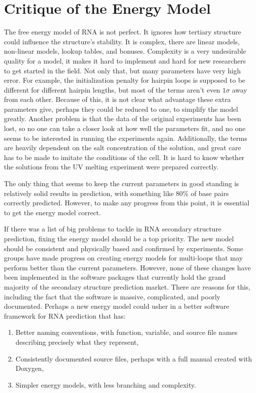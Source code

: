 \section{Critique of the Energy Model}

The free energy model of RNA is not perfect. It ignores how tertiary
structure could influence the structure's stability. It is complex,
there are linear models, non-linear models, lookup tables, and
bonuses. Complexity is a very undesirable quality for a model, it
makes it hard to implement and hard for new researchers to get started
in the field.  Not only that, but many parameters have very high
error. For example, the initialization penalty for hairpin loops is
supposed to be different for different hairpin lengths, but most of
the terms aren't even $1\sigma$ away from each other. Because of this,
it is not clear what advantage these extra parameters give, perhaps
they could be reduced to one, to simplify the model greatly. Another
problem is that the data of the original experiments has been lost, so
no one can take a closer look at how well the parameters fit, and no
one seems to be interested in running the experiments
again. Additionally, the terms are heavily dependent on the salt
concentration of the solution, and great care has to be made to
imitate the conditions of the cell. It is hard to know whether the
solutions from the UV melting experiment were prepared correctly.

The only thing that seems to keep the current parameters in good
standing is relatively solid results in prediction, with something
like 80\% of base pairs correctly predicted. However, to make any
progress from this point, it is essential to get the energy model
correct.

If there was a list of big problems to tackle in RNA secondary
structure prediction, fixing the energy model should be a top
priority. The new model should be consistent and physically based and
confirmed by experiments. Some groups have made progress on creating
energy models for multi-loops that may perform better than the current
parameters.
However, none of these changes have been implemented in
the software packages that currently hold the grand majority of the
secondary structure prediction market. There are reasons for this,
including the fact that the software is massive, complicated, and
poorly documented. Perhaps a new energy model could usher in a better
software framework for RNA prediction that has:

\begin{enumerate}
\item Better naming conventions, with function, variable, and source
  file names describing precisely what they represent,
\item Consistently documented source files, perhaps with a full manual
  created with Doxygen,  
\item Simpler energy models, with less branching and complexity.
\end{enumerate}

